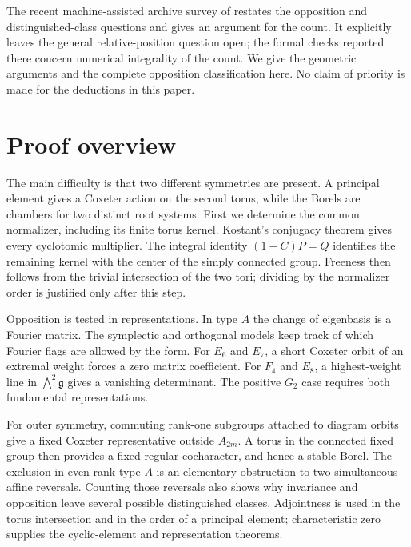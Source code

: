 \documentclass[11pt]{article}
\newcommand{\g}{\mathfrak g}\newcommand{\tfr}{\mathfrak t}
\theoremstyle{definition}\newtheorem{definition}[theorem]{Definition}
\theoremstyle{remark}\newtheorem{remark}[theorem]{Remark}
\begin{document}
The recent machine-assisted archive survey of \citet[Part~II, Problem~7, pp.~391--392]{Hua2026} restates the opposition and distinguished-class questions and gives an argument for the count. It explicitly leaves the general relative-position question open; the formal checks reported there concern numerical integrality of the count. We give the geometric arguments and the complete opposition classification here. No claim of priority is made for the deductions in this paper.

\section{Proof overview}
The main difficulty is that two different symmetries are present. A principal element gives a Coxeter action on the second torus, while the Borels are chambers for two distinct root systems. First we determine the common normalizer, including its finite torus kernel. Kostant's conjugacy theorem gives every cyclotomic multiplier. The integral identity $(1-C)P=Q$ identifies the remaining kernel with the center of the simply connected group. Freeness then follows from the trivial intersection of the two tori; dividing by the normalizer order is justified only after this step.

Opposition is tested in representations. In type $A$ the change of eigenbasis is a Fourier matrix. The symplectic and orthogonal models keep track of which Fourier flags are allowed by the form. For $E_6$ and $E_7$, a short Coxeter orbit of an extremal weight forces a zero matrix coefficient. For $F_4$ and $E_8$, a highest-weight line in $\bigwedge^2\g$ gives a vanishing determinant. The positive $G_2$ case requires both fundamental representations.

For outer symmetry, commuting rank-one subgroups attached to diagram orbits give a fixed Coxeter representative outside $A_{2m}$. A torus in the connected fixed group then provides a fixed regular cocharacter, and hence a stable Borel. The exclusion in even-rank type $A$ is an elementary obstruction to two simultaneous affine reversals. Counting those reversals also shows why invariance and opposition leave several possible distinguished classes. Adjointness is used in the torus intersection and in the order of a principal element; characteristic zero supplies the cyclic-element and representation theorems.
\end{document}
